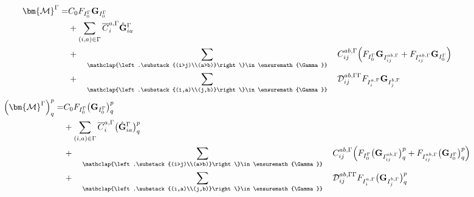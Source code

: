 \documentclass[a4paper,11pt]{article}
\newcommand{\Dmix}{\ensuremath{\mathcal{D}}}
\newcommand{\matG}{\ensuremath{{\mathbf{G}}}}
\newcommand{\matM}{\ensuremath{{\bm{\mathcal{M}}}}}
\newcommand{\irp}{\ensuremath{\Gamma}}
\newcommand{\sumijabrestr}{\ensuremath{
    \quad\sum_{\mathclap{\left.\substack{(i>j)\\(a>b)}\right\}\in\irp}}\quad}}
\newcommand{\sumijabfull}{\ensuremath{
    \quad\sum_{\mathclap{\left.\substack{(i,a)\\(j,b)}\right\}\in\irp}}\quad}}
\begin{document}
\begin{equation}
  \begin{split}
    \matM^\irp = &
    C_0 F_{I_0^\irp} \matG_{I_0^\irp}\\
    & + \sum_{(i,a) \in \irp} \overline{C}_i^{a,\irp}
    \hat{\matG}_{ia}^\irp \\
    & + \sumijabrestr C_{ij}^{ab, \irp}
    \Big(
        F_{I_0^\irp} \matG_{I_{ij}^{ab,\irp}} + F_{I_{ij}^{ab,\irp}} \matG_{I_0^\irp}
    \Big)\\
    & + \sumijabfull \Dmix_{ij}^{ab, \irp\irp}
    F_{I_i^{a,\irp}} \matG_{I_j^{b,\irp}}\\
  \end{split}
\end{equation}
\begin{equation}
  \begin{split}
    \Big(\matM^\irp\Big)^p_q = &
    C_0 F_{I_0^\irp} \big( \matG_{I_0^\irp} \big)^p_q\\
    & + \sum_{(i,a) \in \irp} \overline{C}_i^{a,\irp}
    \big( \hat{\matG}_{ia}^\irp \big)^p_q\\
    & + \sumijabrestr C_{ij}^{ab, \irp}
    \Big(
        F_{I_0^\irp} \big( \matG_{I_{ij}^{ab,\irp}} \big)^p_q
        + F_{I_{ij}^{ab,\irp}} \big( \matG_{I_0^\irp} \big)^p_q
    \Big)\\
    & + \sumijabfull \Dmix_{ij}^{ab, \irp\irp} F_{I_i^{a,\irp}}
    \big( \matG_{I_j^{b,\irp}} \big)^p_q
  \end{split}
\end{equation}
\end{document}
